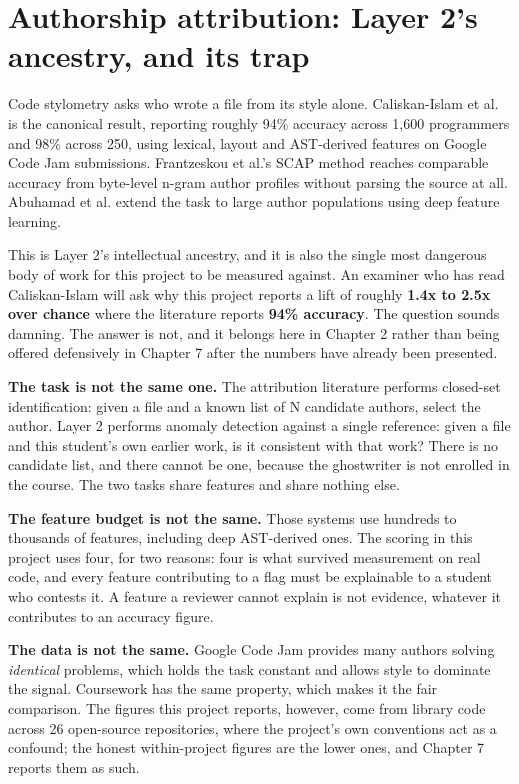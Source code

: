 \hypertarget{authorship-attribution-layer-2s-ancestry-and-its-trap}{%
\section{Authorship attribution: Layer 2's ancestry, and its
trap}\label{authorship-attribution-layer-2s-ancestry-and-its-trap}}

Code stylometry asks who wrote a file from its style alone.
Caliskan-Islam et al.~\cite{caliskan2015} is the canonical result,
reporting roughly 94\% accuracy across 1,600 programmers and 98\% across
250, using lexical, layout and AST-derived features on Google Code Jam
submissions. Frantzeskou et al.'s SCAP method \cite{frantzeskou2006}
reaches comparable accuracy from byte-level n-gram author profiles
without parsing the source at all. Abuhamad et al. \cite{abuhamad2019}
extend the task to large author populations using deep feature learning.

This is Layer 2's intellectual ancestry, and it is also the single most
dangerous body of work for this project to be measured against. An
examiner who has read Caliskan-Islam will ask why this project reports a
lift of roughly \textbf{1.4x to 2.5x over chance} where the literature
reports \textbf{94\% accuracy}. The question sounds damning. The answer
is not, and it belongs here in Chapter 2 rather than being offered
defensively in Chapter 7 after the numbers have already been presented.

\textbf{The task is not the same one.} The attribution literature
performs closed-set identification: given a file and a known list of N
candidate authors, select the author. Layer 2 performs anomaly detection
against a single reference: given a file and this student's own earlier
work, is it consistent with that work? There is no candidate list, and
there cannot be one, because the ghostwriter is not enrolled in the
course. The two tasks share features and share nothing else.

\textbf{The feature budget is not the same.} Those systems use hundreds
to thousands of features, including deep AST-derived ones. The scoring
in this project uses four, for two reasons: four is what survived
measurement on real code, and every feature contributing to a flag must
be explainable to a student who contests it. A feature a reviewer cannot
explain is not evidence, whatever it contributes to an accuracy figure.

\textbf{The data is not the same.} Google Code Jam provides many authors
solving \emph{identical} problems, which holds the task constant and
allows style to dominate the signal. Coursework has the same property,
which makes it the fair comparison. The figures this project reports,
however, come from library code across 26 open-source repositories,
where the project's own conventions act as a confound; the honest
within-project figures are the lower ones, and Chapter 7 reports them as
such.


